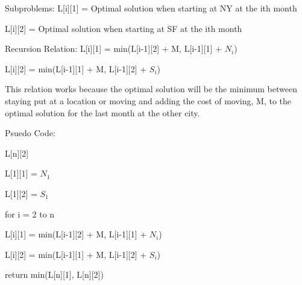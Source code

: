\documentclass{article}
\begin{document}
Subproblems: L[i][1] = Optimal solution when starting at NY at the ith month


\indent\indent\indent\indent\indent L[i][2] = Optimal solution when starting
at SF at the ith month\newline


Recursion Relation: L[i][1] = min(L[i-1][2] + M, L[i-1][1] + $N_{i}$)


\indent\indent\indent\indent\indent \indent \indent L[i][2] =
min(L[i-1][1] + M, L[i-1][2] + $S_{i}$) \newline

This relation works because the optimal solution will be the minimum between
staying put at a location or moving and adding the cost of moving, M, to
the optimal solution for the last month at the other city. \newline

Psuedo Code:

L[n][2]

L[1][1] = $N_{1}$

L[1][2] = $S_{1}$

for i = 2 to n


  \indent \indent  L[i][1] = min(L[i-1][2] + M, L[i-1][1] + $N_{i}$)


  \indent \indent  L[i][2] = min(L[i-1][1] + M, L[i-1][2] + $S_{i}$)

return min(L[n][1], L[n][2]) \newline
\end{document}
